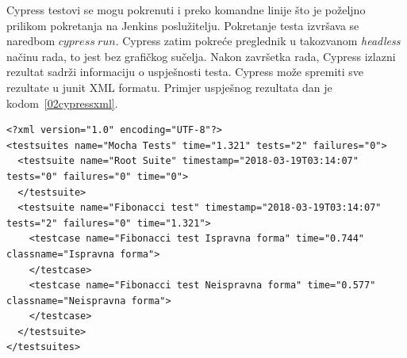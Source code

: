 Cypress testovi se mogu pokrenuti i preko komandne linije što je poželjno prilikom pokretanja na
Jenkins poslužitelju. Pokretanje testa izvršava se naredbom $cypress~run$. Cypress zatim pokreće
preglednik u takozvanom \textit{headless} načinu rada, to jest bez grafičkog sučelja. Nakon
završetka rada, Cypress izlazni rezultat sadrži informaciju o uspješnosti testa. Cypress može
spremiti sve rezultate u junit XML formatu. Primjer uspješnog rezultata dan je
kodom~\ref{02cypressxml}.

\begin{lstlisting}[float=h]
<?xml version="1.0" encoding="UTF-8"?>
<testsuites name="Mocha Tests" time="1.321" tests="2" failures="0">
  <testsuite name="Root Suite" timestamp="2018-03-19T03:14:07" tests="0" failures="0" time="0">
  </testsuite>
  <testsuite name="Fibonacci test" timestamp="2018-03-19T03:14:07" tests="2" failures="0" time="1.321">
    <testcase name="Fibonacci test Ispravna forma" time="0.744" classname="Ispravna forma">
    </testcase>
    <testcase name="Fibonacci test Neispravna forma" time="0.577" classname="Neispravna forma">
    </testcase>
  </testsuite>
</testsuites>
\end{lstlisting}
